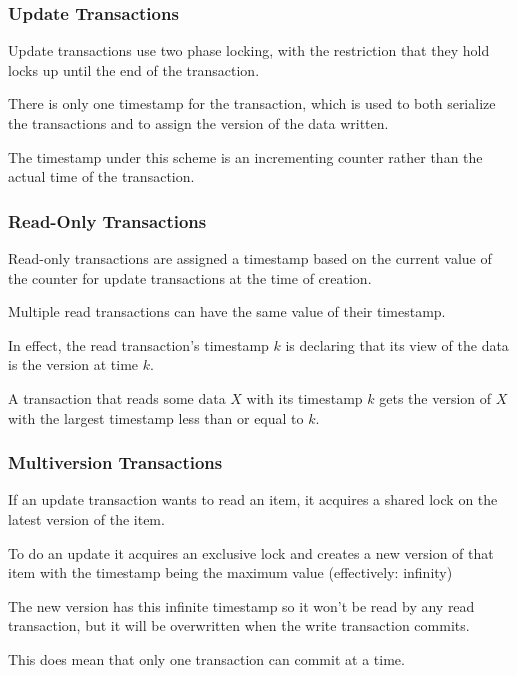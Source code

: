 \begin{frame}
\frametitle{Update Transactions}
Update transactions use two phase locking, with the restriction that they hold locks up until the end of the transaction. 

There is only one timestamp for the transaction, which is used to both serialize the transactions and to assign the version of the data written.

The timestamp under this scheme is an incrementing counter rather than the actual time of the transaction. 

\end{frame}

\begin{frame}
\frametitle{Read-Only Transactions}
Read-only transactions are assigned a timestamp based on the current value of the counter for update transactions at the time of creation. 

Multiple read transactions can have the same value of their timestamp. 

In effect, the read transaction's timestamp $k$ is declaring that its view of the data is the version at time $k$. 

A transaction that reads some data $X$ with its timestamp $k$ gets the version of $X$ with the largest timestamp less than or equal to $k$. 

\end{frame}

\begin{frame}
\frametitle{Multiversion Transactions}
If an update transaction wants to read an item, it acquires a shared lock on the latest version of the item.

To do an update it acquires an exclusive lock and creates a new version of that item with the timestamp being the maximum value (effectively: infinity)

The new version has this infinite timestamp so it won't be read by any read transaction, but it will be overwritten when the write transaction commits.

This does mean that only one transaction can commit at a time.

\end{frame}

















